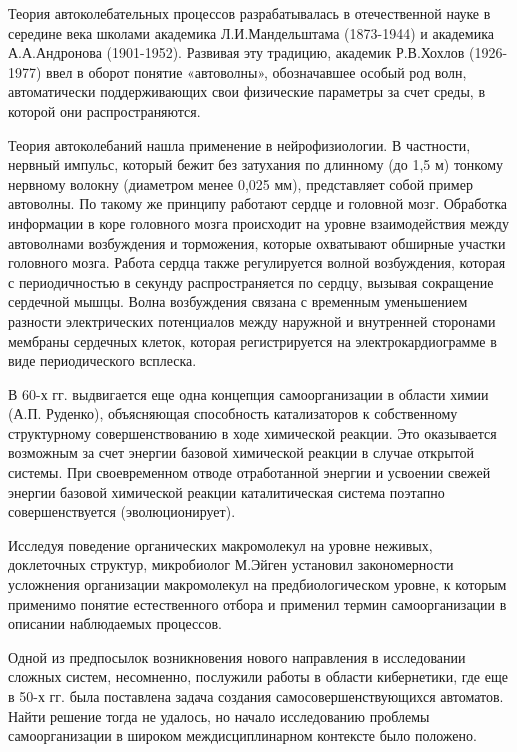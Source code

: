 \documentclass[exam_answers.tex]{subfiles}
\begin{document}
Теория автоколебательных процессов разрабатывалась в отечественной
науке в середине века школами академика Л.И.Мандельштама (1873-1944) и
академика А.А.Андронова (1901-1952). Развивая эту традицию, академик
Р.В.Хохлов (1926-1977) ввел в оборот понятие «автоволны», обозначавшее
особый род волн, автоматически поддерживающих свои физические параметры
за счет среды, в которой они распространяются.

Теория автоколебаний нашла применение в нейрофизиологии. В
частности, нервный импульс, который бежит без затухания по длинному (до 1,5
м) тонкому нервному волокну (диаметром менее 0,025 мм), представляет собой
пример автоволны. По такому же принципу работают сердце и головной мозг.
Обработка информации в коре головного мозга происходит на уровне
взаимодействия между автоволнами возбуждения и торможения, которые
охватывают обширные участки головного мозга. Работа сердца также
регулируется волной возбуждения, которая с периодичностью в секунду
распространяется по сердцу, вызывая сокращение сердечной мышцы. Волна
возбуждения связана с временным уменьшением разности электрических
потенциалов между наружной и внутренней сторонами мембраны сердечных
клеток, которая регистрируется на электрокардиограмме в виде периодического
всплеска.

В 60-х гг. выдвигается еще одна концепция самоорганизации в области
химии (А.П. Руденко), объясняющая способность катализаторов к
собственному структурному совершенствованию в ходе химической реакции.
Это оказывается возможным за счет энергии базовой химической реакции в
случае открытой системы. При своевременном отводе отработанной энергии и
усвоении свежей энергии базовой химической реакции каталитическая система
поэтапно совершенствуется (эволюционирует).

Исследуя поведение органических макромолекул на уровне неживых,
доклеточных структур, микробиолог М.Эйген установил закономерности
усложнения организации макромолекул на предбиологическом уровне, к
которым применимо понятие естественного отбора и применил термин
самоорганизации в описании наблюдаемых процессов.

Одной из предпосылок возникновения нового направления в исследовании
сложных систем, несомненно, послужили работы в области кибернетики, где
еще в 50-х гг. была поставлена задача создания самосовершенствующихся
автоматов. Найти решение тогда не удалось, но начало исследованию
проблемы самоорганизации в широком междисциплинарном контексте было
положено.
\end{document}
